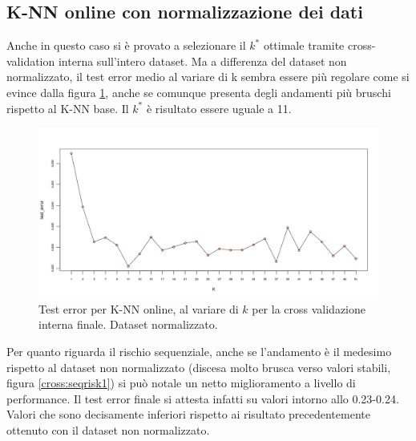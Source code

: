 \documentclass[fleqn,10pt]{SelfArx} %
\begin{document}
\subsection{K-NN online con normalizzazione dei dati}
Anche in questo caso si è provato a selezionare il $k^{*}$ ottimale tramite cross-validation interna sull'intero dataset. Ma a differenza del dataset non normalizzato, il test error medio al variare di k sembra essere più regolare come si evince dalla figura \ref{cross:final4}, anche se comunque presenta degli andamenti più bruschi rispetto al K-NN base. Il $k^{*}$ è risultato essere uguale  a 11.
\newline

\begin{figure}
\includegraphics[scale=0.27]{knn_online_norm/final_seq.png}
\caption{\footnotesize{Test error per K-NN online, al variare di $k$ per la cross validazione interna finale. Dataset normalizzato.}}
\label{cross:final4}
\end{figure}

Per quanto riguarda il rischio sequenziale, anche se l'andamento è il medesimo rispetto al dataset non normalizzato (discesa molto brusca verso valori stabili, figura \ref{cross:seqrisk1}) si può notale un netto miglioramento a livello di performance. Il test error finale si attesta infatti su valori intorno allo 0.23-0.24. Valori che sono decisamente inferiori rispetto ai risultato precedentemente ottenuto con il dataset non normalizzato. 
\end{document}
